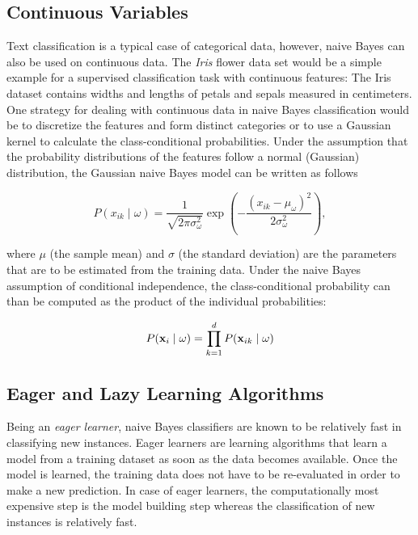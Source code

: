 \documentclass{article}
\begin{document}
\subsection{Continuous Variables}
\label{sec:continuous_variables}

Text classification is a typical case of categorical data, however, naive Bayes can also be used on continuous data. The \emph{Iris} flower data set would be a simple example for a supervised classification task with continuous features: The Iris dataset contains widths and lengths of petals and sepals measured in centimeters.  One strategy for dealing with continuous data in naive Bayes classification would be to discretize the features and form distinct categories or to use a Gaussian kernel to calculate the class-conditional probabilities. Under the assumption that the probability distributions of the features  follow a normal  (Gaussian)  distribution, the Gaussian naive Bayes model can be written as follows

\begin{equation} P(x_{ik} \mid \omega) = \frac{1}{\sqrt{2\pi\sigma^2_{\omega}}} \exp\left(-\frac{(x_{ik} - \mu_{\omega})^2}{2\sigma^2_{\omega}}\right), \end{equation}

where $\mu$ (the sample mean) and $\sigma$ (the standard deviation) are the parameters that are to be estimated from the training data. Under the naive Bayes assumption of conditional independence, the class-conditional probability can than be computed as the product of the individual probabilities:


\begin{equation} P(\textbf x_i \mid \omega) = \prod_{k=1}^{d} P(\textbf x_{ik} \mid \omega) \end{equation}

\subsection{Eager and Lazy Learning Algorithms}
\label{sec:eager_and_lazy}

Being an \emph{eager learner}, naive Bayes classifiers are known to be relatively fast in classifying new instances. Eager learners are learning algorithms that learn a model from a training dataset as soon as the data becomes available. Once the model is learned, the training data does not have to be re-evaluated in order to make a new prediction. In case of eager learners, the computationally most expensive step is the model building step whereas the classification of new instances is relatively fast.  
\end{document}
